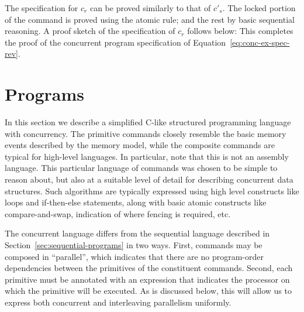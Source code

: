 \documentclass[11pt]{report}
\begin{document}
The specification for $c_r$ can be proved similarly to that of $c'_s$. The locked portion of the command is proved using the atomic rule; and the rest by basic sequential reasoning. A proof sketch of the specification of $c_r$ follows below: 
This completes the proof of the concurrent program specification of Equation~\ref{eq:conc-ex-spec-rev}.

\section{Programs}
\label{sec:programming-language}

In this section we describe a simplified C-like structured programming language with concurrency. The primitive commands closely resemble the basic memory events described by the memory model, while the composite commands are typical for high-level languages. In particular, note that this is not an assembly language. This particular language of commands was chosen to be simple to reason about, but also at a suitable level of detail for describing concurrent data structures. Such algorithms are typically expressed using high level constructs like loops and if-then-else statements, along with basic atomic constructs like compare-and-swap, indication of where fencing is required, etc. 

The concurrent language differs from the sequential language described in Section~\ref{sec:sequential-programs} in two ways. First, commands may be composed in ``parallel'', which indicates that there are no program-order dependencies between the primitives of the constituent commands. Second, each primitive must be annotated with an expression that indicates the processor on which the primitive will be executed. As is discussed below, this will allow us to express both concurrent and interleaving parallelism uniformly.
\end{document}

